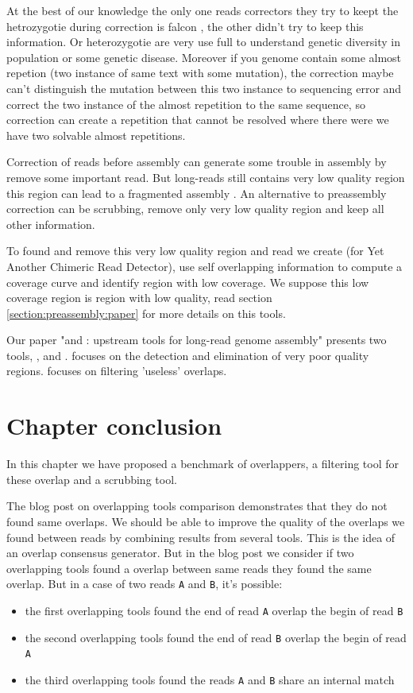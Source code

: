 \documentclass[main.tex]{subfiles}
\begin{document}
At the best of our knowledge the only one reads correctors they try to keept the hetrozygotie during correction is falcon \cite{falcon}, the other didn't try to keep this information. Or heterozygotie are very use full to understand genetic diversity in population or some genetic disease.
Moreover if you genome contain some almost repetion (two instance of same text with some mutation), the correction maybe can't distinguish the mutation between this two instance to sequencing error and correct the two instance of the almost repetition to the same sequence, so correction can create a repetition that cannot be resolved where there were we have two solvable almost repetitions.

Correction of reads before assembly can generate some trouble in assembly by remove some important read. But long-reads still contains very low quality region \cite{blog_post_error_repartition} this region can lead to a fragmented assembly \cite{long_read_assembler_comparison}. An alternative to preassembly correction can be scrubbing, remove only very low quality region and keep all other information.

To found and remove this very low quality region and read we create \yacrd (for Yet Another Chimeric Read Detector), \yacrd use self overlapping information to compute a coverage curve and identify region with low coverage. We suppose this low coverage region is region with low quality, read section \ref{section:preassembly:paper} for more details on this tools.


Our paper "\yacrd and \fpa: upstream tools for long-read genome assembly" presents two tools, \yacrd , and \fpa. \yacrd focuses on the detection and elimination of very poor quality regions. \fpa focuses on filtering 'useless' overlaps.



\section{Chapter conclusion}

In this chapter we have proposed a benchmark of overlappers, a filtering tool for these overlap and a scrubbing tool.

The blog post on overlapping tools comparison demonstrates that they do not found same overlaps. We should be able to improve the quality of the overlaps we found between reads by combining results from several tools. This is the idea of an overlap consensus generator. But in the blog post we consider if two overlapping tools found a overlap between same reads they found the same overlap. But in a case of two reads \texttt{A} and \texttt{B}, it's possible:
\begin{itemize}
    \item the first overlapping tools found the end of read \texttt{A} overlap the begin of read \texttt{B}
    \item the second overlapping tools found the end of read \texttt{B} overlap the begin of read \texttt{A}
    \item the third overlapping tools found the reads \texttt{A} and \texttt{B} share an internal match
\end{itemize}
\end{document}
